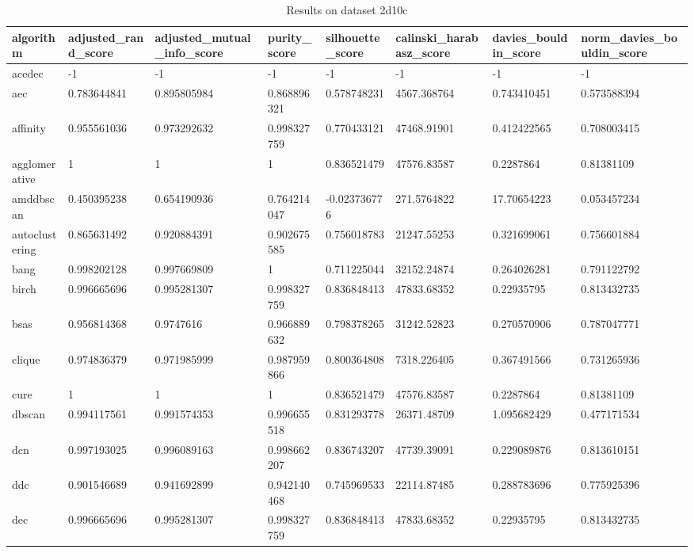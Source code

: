 \begin{table}[H]
\centering
\caption{Results on dataset 2d10c}
\label{tab:params:2d10c}
\begin{tabular}{|l|l|l|l|l|l|l|l|}
\hline
algorithm & adjusted\_rand\_score & adjusted\_mutual\_info\_score & purity\_score & silhouette\_score & calinski\_harabasz\_score & davies\_bouldin\_score & norm\_davies\_bouldin\_score \\
\hline
acedec & -1 & -1 & -1 & -1 & -1 & -1 & -1 \\
\hline
aec & 0.783644841 & 0.895805984 & 0.868896321 & 0.578748231 & 4567.368764 & 0.743410451 & 0.573588394 \\
\hline
affinity & 0.955561036 & 0.973292632 & 0.998327759 & 0.770433121 & 47468.91901 & 0.412422565 & 0.708003415 \\
\hline
agglomerative & 1 & 1 & 1 & 0.836521479 & 47576.83587 & 0.2287864 & 0.81381109 \\
\hline
amddbscan & 0.450395238 & 0.654190936 & 0.764214047 & -0.023736776 & 271.5764822 & 17.70654223 & 0.053457234 \\
\hline
autoclustering & 0.865631492 & 0.920884391 & 0.902675585 & 0.756018783 & 21247.55253 & 0.321699061 & 0.756601884 \\
\hline
bang & 0.998202128 & 0.997669809 & 1 & 0.711225044 & 32152.24874 & 0.264026281 & 0.791122792 \\
\hline
birch & 0.996665696 & 0.995281307 & 0.998327759 & 0.836848413 & 47833.68352 & 0.22935795 & 0.813432735 \\
\hline
bsas & 0.956814368 & 0.9747616 & 0.966889632 & 0.798378265 & 31242.52823 & 0.270570906 & 0.787047771 \\
\hline
clique & 0.974836379 & 0.971985999 & 0.987959866 & 0.800364808 & 7318.226405 & 0.367491566 & 0.731265936 \\
\hline
cure & 1 & 1 & 1 & 0.836521479 & 47576.83587 & 0.2287864 & 0.81381109 \\
\hline
dbscan & 0.994117561 & 0.991574353 & 0.996655518 & 0.831293778 & 26371.48709 & 1.095682429 & 0.477171534 \\
\hline
dcn & 0.997193025 & 0.996089163 & 0.998662207 & 0.836743207 & 47739.39091 & 0.229089876 & 0.813610151 \\
\hline
ddc & 0.901546689 & 0.941692899 & 0.942140468 & 0.745969533 & 22114.87485 & 0.288783696 & 0.775925396 \\
\hline
dec & 0.996665696 & 0.995281307 & 0.998327759 & 0.836848413 & 47833.68352 & 0.22935795 & 0.813432735 \\

\end{tabular}
\end{table}
